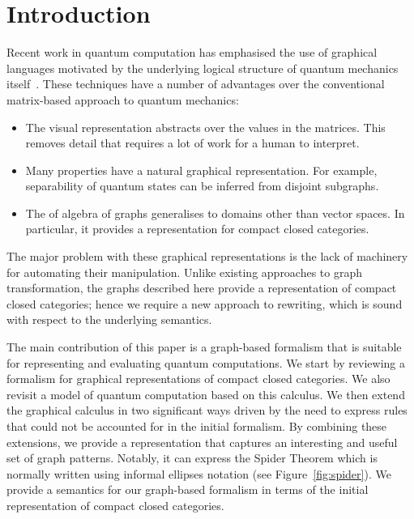 \documentclass[runningheads]{llncs}
\begin{document}
\section{Introduction}
\label{sec:introduction}

Recent work in quantum computation has emphasised the use of graphical
languages motivated by the underlying logical structure of quantum
mechanics
itself~\cite{AbrCoe:CatSemQuant:2004,Selinger:dagger:2005,Coecke2005Kindergarten-Qu,Coecke2006POVMs-and-Naima,Coecke2006Quantum-Measure}.
These techniques have a number of advantages over the conventional
matrix-based approach to quantum mechanics:

\begin{itemize}
\item The visual representation abstracts over the values in the
  matrices. This removes detail that requires a lot of work for a
  human to interpret. 

\item Many properties have a natural graphical representation. For
  example, separability of quantum states can be inferred from disjoint subgraphs.

\item The of algebra of graphs generalises to domains other than
  vector spaces. In particular, it provides a representation for
  compact closed categories. 

\end{itemize}

The major problem with these graphical representations is the lack of
machinery for automating their manipulation. Unlike existing approaches to
graph transformation, the graphs described here provide a 
representation of compact closed categories; hence we require a new
approach to rewriting, which is sound with respect to the underlying
semantics.

The main contribution of this paper is a graph-based formalism that is
suitable for representing and evaluating quantum computations. We
start by reviewing a formalism for graphical representations of
compact closed categories. We also revisit a model of quantum
computation based on this calculus. We then extend the graphical
calculus in two significant ways driven by the need to express rules
that could not be accounted for in the initial formalism. By combining
these extensions, we provide a representation that captures an
interesting and useful set of graph patterns. Notably, it can express
the Spider Theorem which is normally written using informal ellipses
notation (see Figure~\ref{fig:spider}). We provide a semantics for our
graph-based formalism in terms of the initial representation of
compact closed categories.
\end{document}
